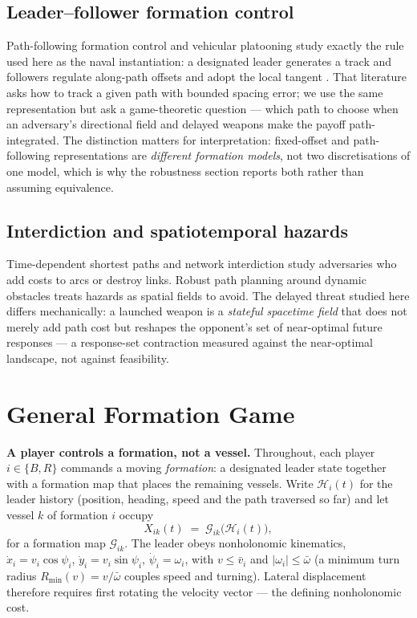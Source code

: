 \documentclass[12pt,a4paper]{article}
\begin{document}
\subsection{Leader--follower formation control}
Path-following formation control and vehicular platooning study exactly the
rule used here as the naval instantiation: a designated leader generates a
track and followers regulate along-path offsets and adopt the local tangent
\cite{skjetne2005, dunbar2006}.  That literature asks how to track a given
path with bounded spacing error; we use the same representation but ask a
game-theoretic question --- which path to choose when an adversary's
directional field and delayed weapons make the payoff path-integrated.  The
distinction matters for interpretation: fixed-offset and path-following
representations are \emph{different formation models}, not two
discretisations of one model, which is why the robustness section reports
both rather than assuming equivalence.

\subsection{Interdiction and spatiotemporal hazards}
Time-dependent shortest paths \cite{orda1990} and network interdiction
\cite{israeli2002} study adversaries who add costs to arcs or destroy
links.  Robust path planning around dynamic obstacles treats hazards as
spatial fields to avoid.  The delayed threat studied here differs
mechanically: a launched weapon is a \emph{stateful spacetime field} that
does not merely add path cost but reshapes the opponent's set of
near-optimal future responses --- a response-set contraction measured
against the near-optimal landscape, not against feasibility.

\section{General Formation Game}\label{sec:model}

\noindent\textbf{A player controls a formation, not a vessel.}  Throughout,
each player $i\in\{B,R\}$ commands a moving \emph{formation}: a designated
leader state together with a formation map that places the remaining
vessels.  Write $\mathcal H_i(t)$ for the leader history (position, heading,
speed and the path traversed so far) and let vessel $k$ of formation $i$
occupy
\begin{equation}
X_{ik}(t) \;=\; \mathcal G_{ik}\bigl(\mathcal H_i(t)\bigr),
\label{eq:formation}
\end{equation}
for a formation map $\mathcal G_{ik}$.  The leader obeys nonholonomic
kinematics, $\dot x_i=v_i\cos\psi_i$, $\dot y_i=v_i\sin\psi_i$,
$\dot\psi_i=\omega_i$, with $v\le\bar v_i$ and
$|\omega_i|\le\bar\omega$ (a minimum turn radius
$R_{\min}(v)=v/\bar\omega$ couples speed and turning).  Lateral
displacement therefore requires first rotating the velocity vector --- the
defining nonholonomic cost.
\end{document}
